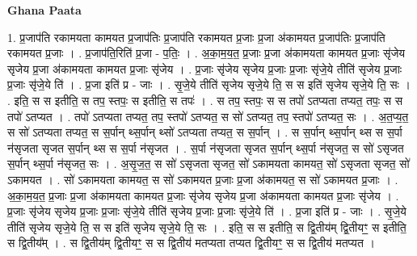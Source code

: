 \documentclass[17pt]{extarticle}
\begin{document}
\textbf{Ghana Paata } \newline

1. प्र॒जाप॑ति रकामयता कामयत प्र॒जाप॑तिः प्र॒जाप॑ति रकामयत प्र॒जाः प्र॒जा अ॑कामयत प्र॒जाप॑तिः प्र॒जाप॑ति रकामयत प्र॒जाः । . प्र॒जाप॑ति॒रिति॑ प्र॒जा - प॒तिः॒ । . अ॒का॒म॒य॒त॒ प्र॒जाः प्र॒जा अ॑कामयता कामयत प्र॒जाः सृ॑जेय सृजेय प्र॒जा अ॑कामयता कामयत प्र॒जाः सृ॑जेय । . प्र॒जाः सृ॑जेय सृजेय प्र॒जाः प्र॒जाः सृ॑जे॒ये तीति॑ सृजेय प्र॒जाः प्र॒जाः सृ॑जे॒ये ति॑ । . प्र॒जा इति॑ प्र - जाः । . सृ॒जे॒ये तीति॑ सृजेय सृजे॒ये ति॒ स स इति॑ सृजेय सृजे॒ये ति॒ सः । . इति॒ स स इतीति॒ स तप॒ स्तपः॒ स इतीति॒ स तपः॑ । . स तप॒ स्तपः॒ स स तपो॑ ऽतप्यता तप्यत॒ तपः॒ स स तपो॑ ऽतप्यत । . तपो॑ ऽतप्यता तप्यत॒ तप॒ स्तपो॑ ऽतप्यत॒ स सो॑ ऽतप्यत॒ तप॒ स्तपो॑ ऽतप्यत॒ सः । . अ॒त॒प्य॒त॒ स सो॑ ऽतप्यता तप्यत॒ स स॒र्पान् थ्स॒र्पान् थ्सो॑ ऽतप्यता तप्यत॒ स स॒र्पान् । . स स॒र्पान् थ्स॒र्पान् थ्स स स॒र्पा न॑सृजता सृजत स॒र्पान् थ्स स स॒र्पा न॑सृजत । . स॒र्पा न॑सृजता सृजत स॒र्पान् थ्स॒र्पा न॑सृजत॒ स सो॑ ऽसृजत स॒र्पान् थ्स॒र्पा न॑सृजत॒ सः । . अ॒सृ॒ज॒त॒ स सो॑ ऽसृजता सृजत॒ सो॑ ऽकामयता कामयत॒ सो॑ ऽसृजता सृजत॒ सो॑ ऽकामयत । . सो॑ ऽकामयता कामयत॒ स सो॑ ऽकामयत प्र॒जाः प्र॒जा अ॑कामयत॒ स सो॑ ऽकामयत प्र॒जाः । . अ॒का॒म॒य॒त॒ प्र॒जाः प्र॒जा अ॑कामयता कामयत प्र॒जाः सृ॑जेय सृजेय प्र॒जा अ॑कामयता कामयत प्र॒जाः सृ॑जेय । . प्र॒जाः सृ॑जेय सृजेय प्र॒जाः प्र॒जाः सृ॑जे॒ये तीति॑ सृजेय प्र॒जाः प्र॒जाः सृ॑जे॒ये ति॑ । . प्र॒जा इति॑ प्र - जाः । . सृ॒जे॒ये तीति॑ सृजेय सृजे॒ये ति॒ स स इति॑ सृजेय सृजे॒ये ति॒ सः । . इति॒ स स इतीति॒ स द्वि॒तीय॑म् द्वि॒तीयꣳ॒॒ स इतीति॒ स द्वि॒तीय᳚म् । . स द्वि॒तीय॑म् द्वि॒तीयꣳ॒॒ स स द्वि॒तीय॑ मतप्यता तप्यत द्वि॒तीयꣳ॒॒ स स द्वि॒तीय॑ मतप्यत । \newline
\end{document}
